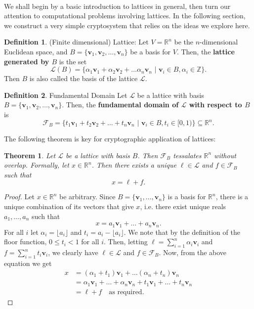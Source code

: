 \documentclass{article}
\newtheorem{theorem}{Theorem}[section]
\theoremstyle{definition}
\newtheorem{definition}{Definition}[section]
\renewcommand{\L}{\mathcal{L}}
\newcommand{\F}{\mathcal{F}}
\newcommand{\Int}{\mathbb{Z}}
\newcommand{\Reals}{\mathbb{R}}
\renewcommand{\vec}[1]{\textbf{#1}}
\begin{document}
\paragraph{} We shall begin by a basic introduction to lattices in general, then
turn our attention to computational problems involving lattices. In the
following section, we construct a very simple cryptosystem that relies on the
ideas we explore here.
\begin{definition}{(Finite dimensional) Lattice:}
  Let $V = \Reals^n$ be the $n$-dimensional Euclidean space, and $B = \{\vec{v}_1,
  \vec{v}_2, \hdots, \vec{v}_n\}$ be a basis for $V$. Then, the \textbf{lattice generated by $B$} is the set
  \[
    \L(B) = \{\alpha_1\vec{v}_1 + \alpha_2\vec{v}_2 + \hdots \alpha_n\vec{v}_n\,\,|\,\, \vec{v}_i \in B,
    \alpha_i \in \Int\}.
  \]
  Then $B$ is also called the basis of the lattice $\L$.
\end{definition}
\begin{definition}{Fundamental Domain}
  Let $\L$ be a lattice with basis $B = \{\vec{v}_1, \vec{v}_2, \hdots, \vec{v}_n\}$. Then, the
  \textbf{fundamental domain of $\L$ with respect to $B$} is
  \[
    \F_B = \{t_1\vec{v}_1 + t_2\vec{v}_2 + \hdots + t_n\vec{v}_n \,\,|\,\, \vec{v}_i \in B, t_i \in [0,
    1)\} \subseteq \Reals^n.
  \]
\end{definition}
The following theorem is key for cryptographic application of lattices:
\begin{theorem}
  Let $\L$ be a lattice with basis $B$. Then $\F_B$ tessalates $\Reals^n$
  without overlap. Formally, let $x \in \Reals^n$. Then there exists a unique $\ell \in \L$
  and $f \in \F_B$ such that
\[
  x = \ell + f.
\]
\end{theorem}
\begin{proof}
  Let $x \in \Reals^n$ be arbitrary. Since $B = \{ \vec{v}_1, \hdots, \vec{v}_n \}$ is a basis for $\Reals^n$, there
  is a unique combination of its vectors that give $x$, i.e. there exist unique
  reals $a_1, \hdots, a_n$ such that
  \[
    x = a_1\vec{v}_1 + \hdots + a_n\vec{v}_n.
  \]
  For all $i$ let $\alpha_i = \lfloor a_i \rfloor$ and $t_i = a_i - \lfloor a_i
  \rfloor$. We note that by the definition of the floor function, $0 \leq t_i <
  1$ for all $i$. Then, letting $\ell = \sum_{i = 1}^n \alpha_i\vec{v}_i$ and $f
  = \sum_{i = 1}^n t_i\vec{v}_i$, we clearly have $\ell \in \L$ and $f \in
  \F_B$. Now, from the above equation we get
  \begin{align*}
    x &= (\alpha_1 + t_1)\vec{v}_1 + \hdots (\alpha_n + t_n)\vec{v}_n \\
      &= \alpha_1\vec{v}_1 + \hdots + \alpha_n\vec{v}_n + t_1\vec{v}_1 + \hdots + t_n\vec{v}_n \\
      &= \ell + f \quad \text{as required.}
  \end{align*}
\end{proof}
\end{document}
